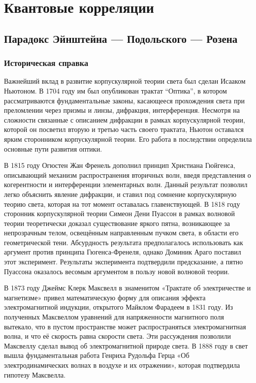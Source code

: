 \section{Квантовые корреляции} 

\subsection{Парадокс Эйнштейна — Подольского — Розена}

\subsubsection{Историческая справка}

Важнейший вклад в развитие корпускулярной теории света был сделан Исааком Ньютоном.
В 1704 году им был опубликован трактат ``Оптика'', 
в котором рассматриваются фундаментальные законы, 
касающееся прохождения света при преломлении через призмы и линзы, дифракция, интерференция. 
Несмотря на сложности связанные с описанием дифракции в рамках корпускулярной теории, которой он посветил вторую и третью часть своего трактата, 
Ньютон оставался ярким сторонником корпускулярной теории. 
Его работа в последствии определила основные пути развития оптики.

В 1815 году Огюстен Жан Френель дополнил принцип Христиана Гюйгенса, 
описывающий механизм распространения вторичных волн,
введя представления о когерентности и интерференции элементарных волн. 
Данный результат позволил легко объяснить явление дифракции, 
и ставил под сомнение корпускулярную теорию света, 
которая на тот момент оставалась главенствующей. 
В 1818 году сторонник корпускулярной теории Симеон Дени Пуассон 
в рамках волновой теории теоретически доказал существование яркого пятна, 
возникающее за непрозрачным телом, 
освещённым направленным пучком света, 
в области его геометрической тени.
Абсурдность результата предполагалось использовать как аргумент против принципа Гюгенса-Френеля, 
однако Доминик Араго поставил этот эксперимент.
Результаты эксперимента подтвердили предсказание, 
а пятно Пуассона оказалось весомым аргументом в пользу новой волновой теории.

В 1873 году Джеймс Клерк Максвелл в знаменитом «Трактате об электричестве и магнетизме» 
привел математическую форму для описания эффекта электромагнитной индукции,
открытого Майклом Фарадеем в 1831 году. 
Из полученных Максвеллом уравнений для напряженности магнитного поля вытекало, что в пустом пространстве может распространяться электромагнитная волна, и что её скорость равна скорости света.  
Эти рассуждения позволили Максвеллу сделал вывод об электромагнитной природе света. 
В 1888 году в свет вышла фундаментальная работа Генриха Рудольфа Герца «Об электродинамических волнах в воздухе и их отражении», 
которая подтвердила гипотезу Максвелла. 

